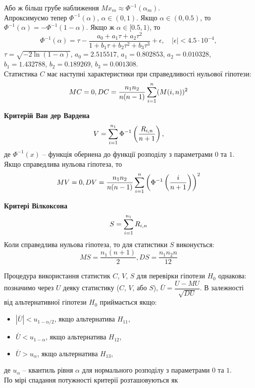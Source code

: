 Або ж більш грубе наближення $M x_m \approx \Phi^{-1}(\alpha_m)$.  \\

Апроксимуємо тепер $\Phi^{-1}(\alpha)$, $\alpha\in (0, 1)$. Якщо $\alpha \in (0, 0.5)$, то $\Phi^{-1}(\alpha) = - \Phi^{-1}(1 - \alpha)$. Якщо ж $\alpha \in [0.5, 1)$, то \[ \Phi^{-1}(\alpha) = \tau - \dfrac{a_0 + a_1\tau + a_2\tau^2}{1 + b_1\tau + b_2\tau^2 + b_3\tau^3} + \epsilon, \quad |\epsilon| < 4.5 \cdot 10^{-4}, \] $\tau = \sqrt{-2\ln(1-\alpha)}$, $a_0 = 2.515517$, $a_1 = 0.802853$, $a_2 = 0.010328$, $b_1 = 1.432788$, $b_2 = 0.189269$, $b_3 = 0.001308$. \\

Статистика $C$ має наступні характеристики при справедливості нульової гіпотези:
\[ M C = 0, D C = \dfrac{n_1 n_2}{n(n-1)} \displaystyle\sum\limits_{i=1}^n (M(i, n))^2 \]

\textbf{Критерій Ван дер Вардена}
\[ V = \displaystyle\sum\limits_{i=1}^{n_1} \Phi^{-1} \left( \dfrac{R_{i,n}}{n+1} \right), \]
де $\Phi^{-1}(x)$ -- функція обернена до функції розподілу з параметрами $0$ та $1$. \\

Якщо справедлива нульова гіпотеза, то
\[ M V = 0, DV = \dfrac{n_1 n_2}{n(n-1)} \displaystyle\sum\limits_{i=1}^n \left( \Phi^{-1} \left( \dfrac{i}{n+1} \right) \right)^2 \]

\textbf{Критері Вілкоксона}
\[ S = \displaystyle\sum\limits_{i=1}^{n_1} R_{i,n} \]
Коли справедлива нульова гіпотеза, то для статистики $S$ виконується:
\[ MS = \dfrac{n_1(n + 1)}{2}, DS = \dfrac{n_1 n_2 n}{12} \]

Процедура використання статистик $C$, $V$, $S$ для перевірки гіпотези $H_0$ однакова: позначимо через $U$ деяку статистику ($C$, $V$, або $S$), $\bar{U} = \dfrac{U - M U}{\sqrt{D U}}$. В залежності від альтернативної гіпотези $H_0$ приймається якщо:
\begin{itemize}
    \item $|\bar{U}| < u_{1 - \alpha / 2}$, якщо альтернатива $H_{11}$,
    
    \item $\bar{U} < u_{1 - \alpha}$, якщо альтернатива $H_{12}$,
    
    \item $\bar{U} > u_\alpha$, якщо альтернатива $H_{13}$,
\end{itemize}
де $u_\alpha$ -- квантиль рівня $\alpha$ для нормального розподілу з параметрами $0$ та $1$. \\

По мірі спадання потужності критерії розташовуються як

